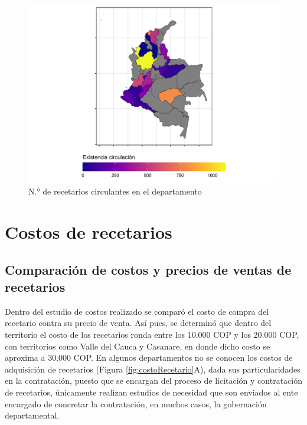 \documentclass[
]{book}
\begin{document}
\begin{figure}

{\centering \includegraphics[width=0.85\linewidth]{InformeFinal_files/figure-latex/existenciasRecetarios2-1} 

}

\caption{N.° de recetarios circulantes en el departamento}\label{fig:existenciasRecetarios2}
\end{figure}

\hypertarget{costos-de-recetarios}{%
\section{Costos de recetarios}\label{costos-de-recetarios}}


\hypertarget{comparaciuxf3n-de-costos-y-precios-de-ventas-de-recetarios}{%
\subsection{Comparación de costos y precios de ventas de recetarios}\label{comparaciuxf3n-de-costos-y-precios-de-ventas-de-recetarios}}

Dentro del estudio de costos realizado se comparó el costo de compra del recetario contra su precio de venta. Así pues, se determinó que dentro del territorio el costo de los recetarios ronda entre los 10.000 COP y los 20.000 COP, con territorios como Valle del Cauca y Casanare, en donde dicho costo se aproxima a 30.000 COP. En algunos departamentos no se conocen los costos de adquisición de recetarios (Figura \ref{fig:costoRecetario}A), dada sus particularidades en la contratación, puesto que se encargan del proceso de licitación y contratación de recetarios, únicamente realizan estudios de necesidad que son enviados al ente encargado de concretar la contratación, en muchos casos, la gobernación departamental.
\end{document}
